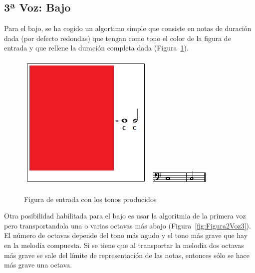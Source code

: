 
\subsection{3ª Voz: Bajo}

Para el bajo, se ha cogido un algortimo simple que consiste en notas de duración dada (por defecto redondas) que tengan como tono el color de la figura de entrada y que rellene la duración completa dada (Figura~\ref{fig:Figura1Voz3}).

		\begin{figure}[htbp]
		\centering
		\hspace*{0.0in}
		\includegraphics[scale=1]{graphics/simpletest2-F2F3.png}
		\includegraphics[scale=1]{graphics/simpletest2-BASSpartitura.png}
		\caption{Figura de entrada con los tonos producidos}
		\label{fig:Figura1Voz3}
		\end{figure}

Otra posibilidad habilitada para el bajo es usar la algoritmia de la primera voz pero transportandola una o varias octavas más abajo (Figura~\ref{fig:Figura2Voz3}). El número de octavas depende del tono más agudo y el tono más grave que hay en la melodía compuesta. Si se tiene que al transportar la melodía dos octavas más grave se sale del límite de representación de las notas, entonces sólo se hace más grave una octava.

